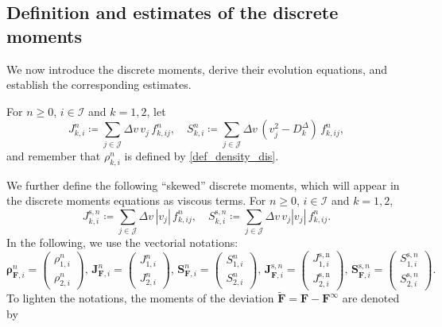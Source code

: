 \documentclass[reqno]{amsart}
\newcommand{\Dv}{\Delta v}
\newcommand{\II}{\mathcal{I}}
\newcommand{\J}{\mathcal{J}}
\newcommand{\Ft}{{\widetilde{F}}}
\newcommand{\Ftbf}{\mathbf{\Ft}}
\newcommand{\Fbf}{\mathbf{F}}
\newcommand{\Jbf}{\mathbf{J}}
\newcommand{\Sbf}{\mathbf{S}}
\newcommand{\rhobf}{\boldsymbol{\rho}}
\numberwithin{equation}{section}
\begin{document}
\subsection{Definition and estimates of the discrete moments}

We now introduce the discrete moments, derive their evolution equations, and establish the corresponding estimates.

For $n\geq0$, $i\in\II$ and $k=1,2$, let
\begin{equation}\label{def_moments_sdiscrets}
   J^n_{k,i}\coloneq\sum_{j\in\J}\Dv\,v_j\,f^n_{k,ij}, \quad S^n_{k,i}\coloneq\sum_{j\in\J}\Dv\,(v_j^2-D_k^\Delta)\,f^n_{k,ij},
\end{equation}
and remember that $\rho^n_{k,i}$ is defined by \eqref{def_density_dis}.

We further define the following ``skewed'' discrete moments, which will appear in the discrete moments equations as viscous terms. For $n\geq0$, $i\in\II$ and $k=1,2$, 
\begin{equation}\label{def_moments_sdiscrets_skewed}
    J^{\mathrm{s},n}_{k,i}\coloneq\sum_{j\in\J}\Dv\,|v_j|\,f^n_{k,ij}, \quad S^{\mathrm{s},n}_{k,i}\coloneq\sum_{j\in\J}\Dv\,v_j|v_j|\,f^n_{k,ij}.
\end{equation}
In the following, we use the vectorial notations:
\begin{equation}\label{def_moments_sdiscrets_vect}
    \rhobf^n_{\Fbf,i} =\begin{pmatrix} \rho^n_{1,i}\\\rho^n_{2,i} \end{pmatrix},\, \Jbf^n_{\Fbf,i}=\begin{pmatrix} J^n_{1,i}\\J^n_{2,i} \end{pmatrix},\, \Sbf^n_{\Fbf,i}=\begin{pmatrix} S^n_{1,i}\\S^n_{2,i} \end{pmatrix},\, \Jbf^{\mathrm{s},n}_{\Fbf,i}=\begin{pmatrix} J^{\mathrm{s,n}}_{1,i}\\J^{\mathrm{s,n}}_{2,i} \end{pmatrix},\, \Sbf^{\mathrm{s},n}_{\Fbf,i}=\begin{pmatrix} S^{\mathrm{s},n}_{1,i}\\S^{\mathrm{s},n}_{2,i} \end{pmatrix}.
\end{equation}
To lighten the notations, the moments of the deviation $\Ftbf=\Fbf-\Fbf^\infty$ are denoted by
\end{document}
